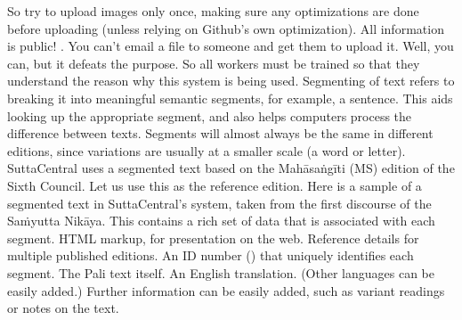 \markdownRendererUlItem {} So try to upload images only once, making sure any optimizations are done before uploading (unless relying on Github’s own optimization).\markdownRendererUlItemEnd 
\markdownRendererUlItem {} All information is public!\markdownRendererUlItemEnd 
\markdownRendererUlItem {}. You can’t email a file to someone and get them to upload it. Well, you can, but it defeats the purpose. So all workers must be trained so that they understand the reason why this system is being used.\markdownRendererUlItemEnd 
\markdownRendererUlEnd \markdownRendererInterblockSeparator
{}\markdownRendererInterblockSeparator
{}Segmenting of text refers to breaking it into meaningful semantic segments, for example, a sentence. This aids looking up the appropriate segment, and also helps computers process the difference between texts.\markdownRendererInterblockSeparator
{}Segments will almost always be the same in different editions, since variations are usually at a smaller scale (a word or letter).\markdownRendererInterblockSeparator
{}SuttaCentral uses a segmented text based on the Mahāsaṅgīti (MS) edition of the Sixth Council. Let us use this as the reference edition. Here is a sample of a segmented text in SuttaCentral’s system, taken from the first discourse of the Saṁyutta Nikāya.\markdownRendererInterblockSeparator
{}\markdownRendererInterblockSeparator
{}This contains a rich set of data that is associated with each segment.\markdownRendererInterblockSeparator
{}\markdownRendererOlBegin
{}HTML markup, for presentation on the web.\markdownRendererOlItemEnd 
{}Reference details for multiple published editions.\markdownRendererOlItemEnd 
{}An ID number () that uniquely identifies each segment.\markdownRendererOlItemEnd 
{}The Pali text itself.\markdownRendererOlItemEnd 
{}An English translation. (Other languages can be easily added.)\markdownRendererOlItemEnd 
\markdownRendererOlEnd \markdownRendererInterblockSeparator
{}Further information can be easily added, such as variant readings or notes on the text.\markdownRendererInterblockSeparator
